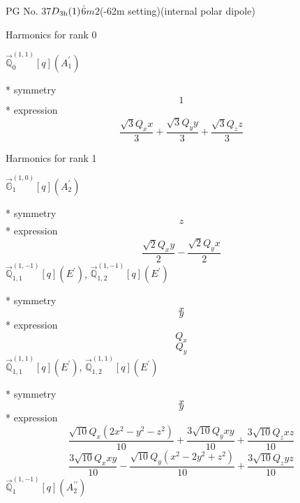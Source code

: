\documentclass[fleqn,8pt]{jsarticle}
\begin{document}
\setcounter{MaxMatrixCols}{32}

\renewcommand{\tablename}{Table~}
\renewcommand{\figurename}{Figure~}
\begin{center}
\LARGE
PG No. 37\quad$D_{\rm 3h}(1)$\quad$\bar{6}m2$\quad(-62m setting)\quad[ hexagonal ] (internal polar dipole)
\end{center}

\noindent * Harmonics for rank 0

\noindent\quad $\vec{\mathbb{Q}}_{0}^{(1,1)}[q](A_{1}^{\prime})$

\noindent\quad ** symmetry
\begin{dmath*}
1
\end{dmath*}
\noindent\quad ** expression
\begin{dmath*}
\frac{\sqrt{3} Q_{x} x}{3} + \frac{\sqrt{3} Q_{y} y}{3} + \frac{\sqrt{3} Q_{z} z}{3}
\end{dmath*}

\noindent * Harmonics for rank 1

\noindent\quad $\vec{\mathbb{G}}_{1}^{(1,0)}[q](A_{2}^{\prime})$

\noindent\quad ** symmetry
\begin{dmath*}
z
\end{dmath*}
\noindent\quad ** expression
\begin{dmath*}
\frac{\sqrt{2} Q_{x} y}{2} - \frac{\sqrt{2} Q_{y} x}{2}
\end{dmath*}
\noindent\quad $\vec{\mathbb{Q}}_{1,1}^{(1,-1)}[q](E^{\prime})$, $\vec{\mathbb{Q}}_{1,2}^{(1,-1)}[q](E^{\prime})$

\noindent\quad ** symmetry
\begin{dmath*}
x
\end{dmath*}
\begin{dmath*}
y
\end{dmath*}
\noindent\quad ** expression
\begin{dmath*}
Q_{x}
\end{dmath*}
\begin{dmath*}
Q_{y}
\end{dmath*}
\noindent\quad $\vec{\mathbb{Q}}_{1,1}^{(1,1)}[q](E^{\prime})$, $\vec{\mathbb{Q}}_{1,2}^{(1,1)}[q](E^{\prime})$

\noindent\quad ** symmetry
\begin{dmath*}
x
\end{dmath*}
\begin{dmath*}
y
\end{dmath*}
\noindent\quad ** expression
\begin{dmath*}
\frac{\sqrt{10} Q_{x} \left(2 x^{2} - y^{2} - z^{2}\right)}{10} + \frac{3 \sqrt{10} Q_{y} x y}{10} + \frac{3 \sqrt{10} Q_{z} x z}{10}
\end{dmath*}
\begin{dmath*}
\frac{3 \sqrt{10} Q_{x} x y}{10} - \frac{\sqrt{10} Q_{y} \left(x^{2} - 2 y^{2} + z^{2}\right)}{10} + \frac{3 \sqrt{10} Q_{z} y z}{10}
\end{dmath*}
\noindent\quad $\vec{\mathbb{Q}}_{1}^{(1,-1)}[q](A_{2}^{\prime\prime})$
\end{document}
